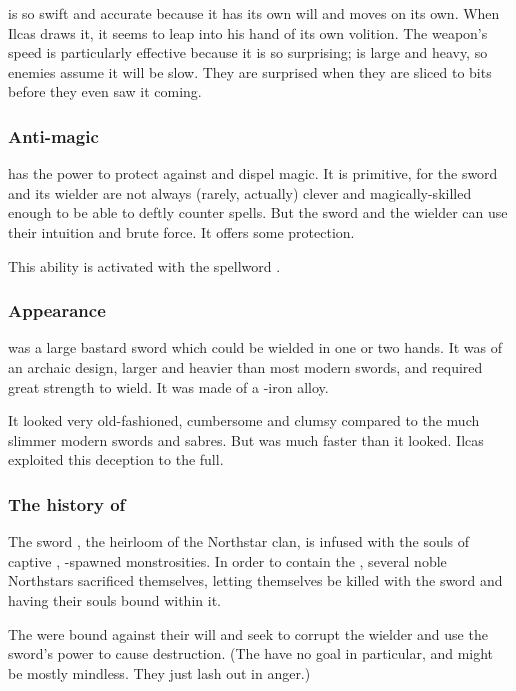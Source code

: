 \Telderain{} is so swift and accurate because it has its own will and moves on its own. 
When Ilcas draws it, it seems to leap into his hand of its own volition. 
The weapon's speed is particularly effective because it is so surprising; \Telderain{} is large and heavy, so enemies assume it will be slow. 
They are surprised when they are sliced to bits before they even saw it coming.





\subsubsection{Anti-magic}
\Telderain{} has the power to protect against and dispel magic. 
It is primitive, for the sword and its wielder are not always (rarely, actually) clever and magically-skilled enough to be able to deftly counter spells. 
But the sword and the wielder can use their intuition and brute force. 
It offers some protection. 

This ability is activated with the spellword . 





\subsubsection{Appearance}
\Telderain{} was a large bastard sword which could be wielded in one or two hands. 
It was of an archaic design, larger and heavier than most modern swords, and required great strength to wield. 
It was made of a \dragonsteel-iron alloy. 

It looked very old-fashioned, cumbersome and clumsy compared to the much slimmer modern swords and sabres. 
But was much faster than it looked. 
Ilcas exploited this deception to the full. 





\subsubsection{The history of \Telderain}
The sword \Telderain, the heirloom of the Northstar clan, is infused with the souls of captive \mdaemons, \xzaishann-spawned monstrosities. In order to contain the \mdaemons, several noble Northstars sacrificed themselves, letting themselves be killed with the sword and having their souls bound within it.

The \daemons{} were bound against their will and seek to corrupt the wielder and use the sword's power to cause destruction. (The \daemons{} have no goal in particular, and might be mostly mindless. They just lash out in anger.) 

